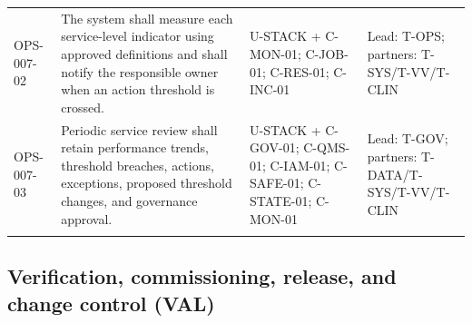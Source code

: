 \documentclass[11pt,letterpaper]{article}
\begin{document}
\begin{scriptsize}
\begin{longtable}{@{}L{0.115\textwidth}L{0.345\textwidth}L{0.265\textwidth}L{0.195\textwidth}@{}}
\addlinespace[2pt]
\mbox{OPS-007-02} & The system shall measure each service-level indicator using approved definitions and shall notify the responsible owner when an action threshold is crossed. & U-STACK + C-MON-01; C-JOB-01; C-RES-01; C-INC-01 & Lead: T-OPS; partners: T-SYS\slash\allowbreak{}T-VV\slash\allowbreak{}T-CLIN \\
\addlinespace[2pt]
\mbox{OPS-007-03} & Periodic service review shall retain performance trends, threshold breaches, actions, exceptions, proposed threshold changes, and governance approval. & U-STACK + C-GOV-01; C-QMS-01; C-IAM-01; C-SAFE-01; C-STATE-01; C-MON-01 & Lead: T-GOV; partners: T-DATA\slash\allowbreak{}T-SYS\slash\allowbreak{}T-VV\slash\allowbreak{}T-CLIN \\
\addlinespace[2pt]
\end{longtable}
\end{scriptsize}

\subsection{Verification, commissioning, release, and change control (VAL)}
\end{document}
